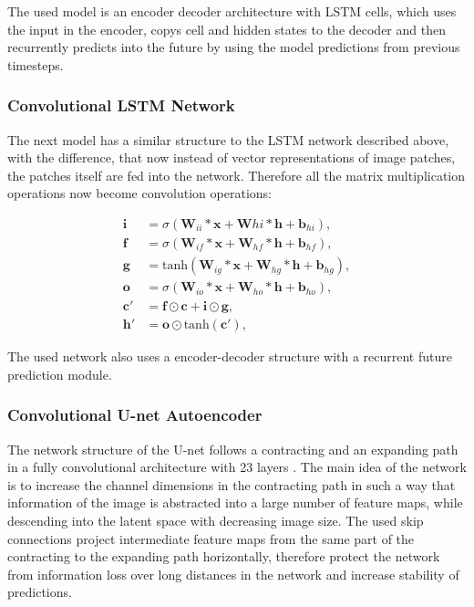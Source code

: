 \documentclass[12pt]{article}
\begin{document}
The used model is an encoder decoder architecture with LSTM cells, which uses the input in the encoder, copys cell and hidden states to the decoder and then recurrently predicts into the future by using the model predictions from previous timesteps.

\subsubsection{Convolutional LSTM Network}
The next model has a similar structure to the LSTM network described above, with the difference, that now instead of vector representations of image patches, the patches itself are fed into the network. Therefore all the matrix multiplication operations now become convolution operations: 

\begin{equation}
	\begin{aligned}
		\mathbf{i} &= \sigma(\mathbf{W}_{ii} * \mathbf{x} + \mathbf{W}{hi} * \mathbf{h} + \mathbf{b}_{hi}), \\
		\mathbf{f} &= \sigma(\mathbf{W}_{if} * \mathbf{x} + \mathbf{W}_{hf} * \mathbf{h} + \mathbf{b}_{hf}), \\
		\mathbf{g} &= \mathrm{tanh}(\mathbf{W}_{ig} * \mathbf{x} + \mathbf{W}_{hg} * \mathbf{h} + \mathbf{b}_{hg}), \\
		\mathbf{o} &= \sigma(\mathbf{W}_{io} * \mathbf{x} + \mathbf{W}_{ho} * \mathbf{h} + \mathbf{b}_{ho}), \\
		\mathbf{c'} &= \mathbf{f} \odot \mathbf{c} + \mathbf{i} \odot \mathbf{g}, \\
		\mathbf{h'} &= \mathbf{o} \odot \mathrm{tanh}(\mathbf{c'}),
	\end{aligned}
	\label{conv_lstm}
\end{equation}

The used network also uses a encoder-decoder structure with a recurrent future prediction module.

\subsubsection{Convolutional U-net Autoencoder}
The network structure of the U-net follows a contracting and an expanding path in a fully convolutional architecture with 23 layers \citep{ronneberger2015u}. The main idea of the network is to increase the channel dimensions in the contracting path in such a way that information of the image is abstracted into a large number of feature maps, while descending into the latent space with decreasing image size. The used skip connections project intermediate feature maps from the same part of the contracting to the expanding path horizontally, therefore protect the network from information loss over long distances in the network and increase stability of predictions.
\end{document}
